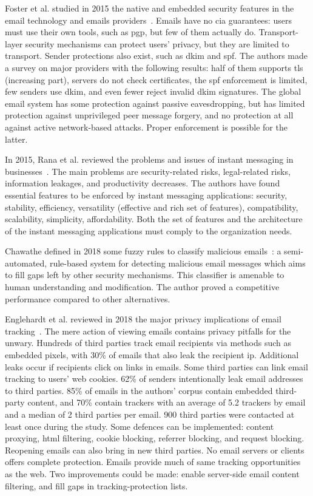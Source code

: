 Foster et al. studied in 2015 the native and embedded security features in the email technology and emails providers~\cite{foster_security_2015}. Emails have no \gls{cia} guarantees: users must use their own tools, such as \gls{pgp}, but few of them actually do. Transport-layer security mechanisms can protect users' privacy, but they are limited to transport. Sender protections also exist, such as \gls{dkim} and \gls{spf}. The authors made a survey on major providers with the following results: half of them supports \gls{tls} (increasing part), servers do not check certificates, the \gls{spf} enforcement is limited, few senders use \gls{dkim}, and even fewer reject invalid \gls{dkim} signatures. The global email system has some protection against passive eavesdropping, but has limited protection against unprivileged peer message forgery, and no protection at all against active network-based attacks. Proper enforcement is possible for the latter. %

In 2015, Rana et al. reviewed the problems and issues of instant messaging in businesses~\cite{rana_enterprise_2015}. The main problems are security-related risks, legal-related risks, information leakages, and productivity decreases. The authors have found essential features to be enforced by instant messaging applications: security, stability, efficiency, versatility (effective and rich set of features), compatibility, scalability, simplicity, affordability. Both the set of features and the architecture of the instant messaging applications must comply to the organization needs. %

Chawathe defined in 2018 some fuzzy rules to classify malicious emails~\cite{chawathe_improving_2018}: a semi-automated, rule-based system for detecting malicious email messages which aims to fill gaps left by other security mechanisms. This classifier is amenable to human understanding and modification. The author proved a competitive performance compared to other alternatives. %

Englehardt et al. reviewed in 2018 the major privacy implications of email tracking~\cite{englehardt_i_2018}. The mere action of viewing emails contains privacy pitfalls for the unwary. Hundreds of third parties track email recipients via methods such as embedded pixels, with 30\% of emails that also leak the recipient \gls{ip}. Additional leaks occur if recipients click on links in emails. Some third parties can link email tracking to users' web cookies. 62\% of senders intentionally leak email addresses to third parties. 85\% of emails in the authors' corpus contain embedded third-party content, and 70\% contain trackers with an average of 5.2 trackers by email and a median of 2 third parties per email. 900 third parties were contacted at least once during the study. Some defences can be implemented: content proxying, \gls{html} filtering, cookie blocking, referrer blocking, and request blocking. Reopening emails can also bring in new third parties. No email servers or clients offers complete protection. Emails provide much of same tracking opportunities as the web. Two improvements could be made: enable server-side email content filtering, and fill gaps in tracking-protection lists. %

